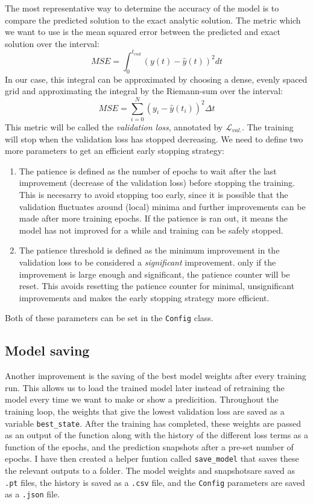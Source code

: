 \documentclass[we,twoside,openright,a4paper,11pt]{uantwerpenbamathesis}
\begin{document}
The most representative way to determine the accuracy of the model is to compare the predicted solution to the exact analytic solution. The metric which we want to use is the mean squared error between the predicted and exact solution over the interval:
\begin{equation}
    MSE = \int_0^{t_{end}} (y(t)-\hat{y}(t))^2 dt
\end{equation}
In our case, this integral can be approximated by choosing a dense, evenly spaced grid and approximating the integral by the Riemann-sum over the interval:
\begin{equation}
    MSE = \sum_{i=0}^{N} (y_i-\hat{y}(t_i))^2 \Delta t
\end{equation}
This metric will be called the \textit{validation loss}, annotated by $\mathcal{L}_{val.}$. The training will stop when the validation loss has stopped decreasing. We need to define two more parameters to get an efficient early stopping strategy:
\begin{enumerate}
    \item The patience is defined as the number of epochs to wait after the last improvement (decrease of the validation loss) before stopping the training. This is necesarry to avoid stopping too early, since it is possible that the validation fluctuates around (local) minima and further improvements can be made after more training epochs. If the patience is ran out, it means the model has not improved for a while and training can be safely stopped.
    \item The patience threshold is defined as the minimum improvement in the validation loss to be considered a \textit{significant} improvement. only if the improvement is large enough and significant, the patience counter will be reset. This avoids resetting the patience counter for minimal, unsignificant improvements and makes the early stopping strategy more efficient.
\end{enumerate}
Both of these parameters can be set in the \verb|Config| class.

\subsection{Model saving}
Another improvement is the saving of the best model weights after every training run. This allows us to load the trained model later instead of retraining the model every time we want to make or show a predicition. Throughout the training loop, the weights that give the lowest validation loss are saved as a variable \verb|best_state|. After the training has completed, these weights are passed as an output of the function along with the history of the different loss terms as a function of the epochs, and the prediction snapshots after a pre-set number of epochs. I have then created a helper funtion called \verb|save_model| that saves these the relevant outputs to a folder. The model weights and snapshotsare saved as \verb|.pt| files, the history is saved as a \verb|.csv| file, and the \verb|Config| parameters are saved as a \verb|.json| file.\\
\end{document}
